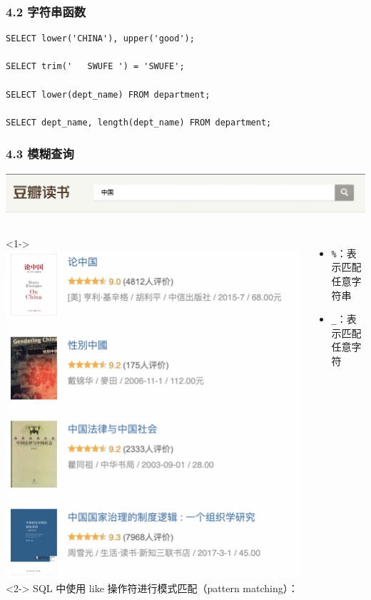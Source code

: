 \documentclass[aspectratio=169, 14pt]{beamer}
\begin{document}
\begin{frame}[fragile]
    \frametitle{4.2 字符串函数}

\begin{verbatim} 
SELECT lower('CHINA'), upper('good');

SELECT trim('   SWUFE ') = 'SWUFE';

SELECT lower(dept_name) FROM department;

SELECT dept_name, length(dept_name) FROM department;
\end{verbatim}

\end{frame}

\begin{frame}
    \frametitle{4.3 模糊查询}
    \includegraphics[width=.8\textwidth]{week4/china.png}
\begin{columns}
    <1->
    \includegraphics[height=.7\paperheight]{week4/china2.png} 
    <2->
SQL 中使用 \alert{like} 操作符进行模式匹配（pattern matching）：
\begin{itemize}
    \item \texttt{\%}：表示匹配任意字符串
    \item \texttt{\_}：表示匹配任意字符
\end{itemize}

\end{columns}

\end{frame}
\end{document}
